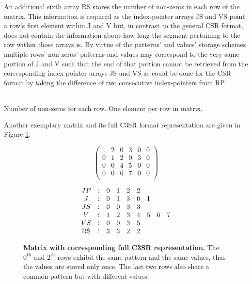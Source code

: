     An additional sixth array RS stores the number of non-zeros in each row of the matrix. This information is required
    as the index-pointer arrays JS and VS point a row's first element within J and V but, in contrast to the general CSR
    format, does not contain the information about how long the segment pertaining to the row within those arrays is. By
    virtue of the patterns' and values' storage schemes multiple rows' non-zeros' patterns and values may correspond to
    the very same portion of J and V such that the end of that portion cannot be retrieved from the corresponding
    index-pointer arrays JS and VS as could be done for the CSR format by taking the difference of two consecutive
    index-pointers from RP.

    \begin{description}[align = left, labelwidth = 4cm]
      \item [RS - \emph{Row sizes}] \hfill \\
        Number of non-zeros for each row. One element per row in matrix.
    \end{description}

    Another exemplary matrix and its full C3SR format representation are given in Figure \ref{fig:c3sr_example_full}.

    \begin{figure}[ht]
      \centering
      \begin{minipage}{0.4\textwidth}
        \centering
        $$
        \begin{pmatrix}
          1 & 2 & 0 & 3 & 0 & 0 \\
          0 & 1 & 2 & 0 & 3 & 0 \\
          0 & 0 & 4 & 5 & 0 & 0 \\
          0 & 0 & 6 & 7 & 0 & 0 \\
        \end{pmatrix}
        $$
      \end{minipage}
      \begin{minipage}{0.4\textwidth}
        \centering
        $$
        \begin{matrix}
          JP & : & 0 & 1 & 2 & 2 &   &   &   \\
           J & : & 0 & 1 & 3 & 0 & 1 &   &   \\
          JS & : & 0 & 0 & 3 & 3 &   &   &   \\
           V & : & 1 & 2 & 3 & 4 & 5 & 6 & 7 \\
          VS & : & 0 & 0 & 3 & 5 &   &   &   \\
          \RS & : & 3 & 3 & 2 & 2 &   &   &   \\
        \end{matrix}
        $$
      \end{minipage}
      \caption[Matrix with corresponding full C3SR representation.]{\textbf{Matrix with corresponding full C3SR representation.} The $0^{\text{th}}$ and $2^{\text{th}}$ rows exhibit the same pattern and the same values, thus the values are stored only once. The last two rows also share a common pattern but with different values.}
      \label{fig:c3sr_example_full}
    \end{figure}

